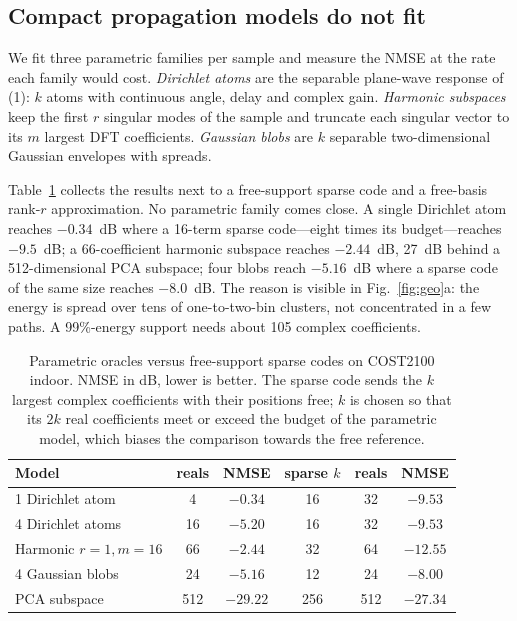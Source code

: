 \documentclass[journal]{IEEEtran}
\begin{document}
\subsection{Compact propagation models do not fit}
We fit three parametric families per sample and measure the NMSE at the rate each
family would cost. \emph{Dirichlet atoms} are the separable plane-wave response of
(1): $k$ atoms with continuous angle, delay and complex gain. \emph{Harmonic
subspaces} keep the first $r$ singular modes of the sample and truncate each
singular vector to its $m$ largest DFT coefficients. \emph{Gaussian blobs} are $k$
separable two-dimensional Gaussian envelopes with spreads.

Table~\ref{tab:oracle} collects the results next to a free-support sparse code and
a free-basis rank-$r$ approximation. No parametric family comes close. A single
Dirichlet atom reaches $-0.34$~dB where a 16-term sparse code---eight times its
budget---reaches $-9.5$~dB; a 66-coefficient harmonic subspace reaches $-2.44$~dB,
27~dB behind a 512-dimensional PCA subspace; four blobs reach $-5.16$~dB where a
sparse code of the same size reaches $-8.0$~dB. The reason is visible in
Fig.~\ref{fig:geo}a: the energy is spread over tens of one-to-two-bin clusters,
not concentrated in a few paths. A 99\%-energy support needs about 105 complex
coefficients.

\begin{table}[!t]
\centering
\caption{Parametric oracles versus free-support sparse codes on COST2100 indoor.
NMSE in dB, lower is better. The sparse code sends the $k$ largest complex
coefficients with their positions free; $k$ is chosen so that its $2k$ real
coefficients meet or exceed the budget of the parametric model, which biases the
comparison towards the free reference.}
\label{tab:oracle}
\footnotesize
\setlength{\tabcolsep}{3.6pt}
\begin{tabular}{@{}lccccc@{}}
\toprule
Model & reals & NMSE & sparse $k$ & reals & NMSE \\
\midrule
1 Dirichlet atom & 4 & $-0.34$ & 16 & 32 & $-9.53$\\
4 Dirichlet atoms & 16 & $-5.20$ & 16 & 32 & $-9.53$\\
Harmonic $r{=}1,m{=}16$ & 66 & $-2.44$ & 32 & 64 & $-12.55$\\
4 Gaussian blobs & 24 & $-5.16$ & 12 & 24 & $-8.00$\\
PCA subspace & 512 & $-29.22$ & 256 & 512 & $-27.34$\\
\bottomrule
\end{tabular}
\end{table}
\end{document}
